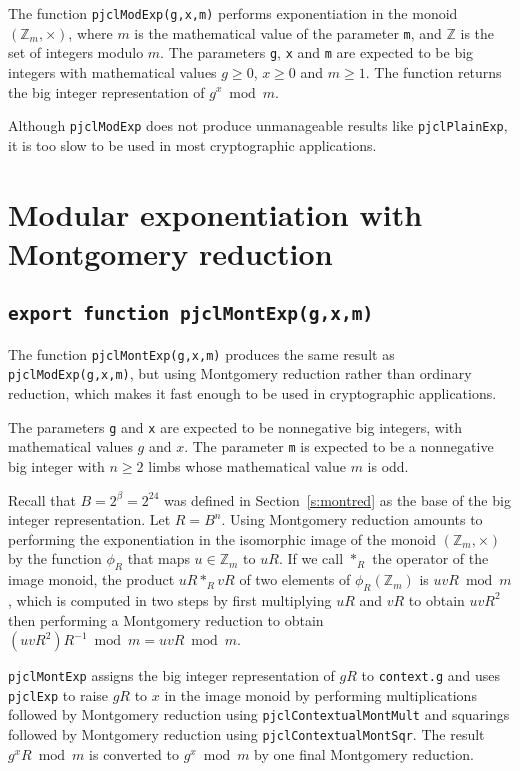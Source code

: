 \documentclass[12pt]{article}
\begin{document}
The function {\tt pjclModExp(g,x,m)} performs exponentiation in the
monoid $(\mathbb{Z}_m,\times)$, where $m$ is the mathematical value of
the parameter {\tt m}, and $\mathbb{Z}$ is the set of integers modulo
$m$.  The parameters {\tt g}, {\tt x} and {\tt m} are expected to be
big integers with mathematical values $g \geq 0$, $x \geq 0$ and $m \geq 1$.
The function returns the big integer representation of $g^x \bmod m$.

Although {\tt pjclModExp} does not produce unmanageable results like
{\tt pjclPlainExp}, it is too slow to be used in most cryptographic
applications.

\section{Modular exponentiation with Montgomery reduction}

\subsection{\tt export function pjclMontExp(g,x,m)}

The function {\tt pjclMontExp(g,x,m)} produces the same result as {\tt
  pjclModExp(g,x,m)}, but using Montgomery reduction rather than
ordinary reduction, which makes it fast enough to be used in
cryptographic applications.

The parameters {\tt g} and {\tt x} are expected to be nonnegative big
integers, with mathematical values $g$ and $x$.  The
parameter {\tt m} is expected to be a nonnegative big integer with $n \geq 2$
limbs whose mathematical value $m$ is odd.

Recall that $B = 2^\beta = 2^{24}$ was defined in
Section~\ref{s:montred} as the base of the big integer representation.
Let $R = B^n$.  Using Montgomery reduction amounts to performing the
exponentiation in the isomorphic image of the monoid
$(\mathbb{Z}_m,\times)$ by the function $\phi_R$ that maps $u \in
\mathbb{Z}_m$ to $uR$.  If we call $\ast_R$ the operator of the image
monoid, the product $uR \ast_R vR$ of two elements of
$\phi_R(\mathbb{Z}_m)$ is $uvR \bmod m$, which is computed in two steps
by first multiplying $uR$ and $vR$ to obtain $uvR^2$ then performing a
Montgomery reduction to obtain $(uvR^2)R^{-1} \bmod m = uvR \bmod m$.

{\tt pjclMontExp} assigns the big integer representation of $gR$ to
{\tt context.g} and uses {\tt pjclExp} to raise $gR$ to $x$ in the
image monoid by performing multiplications followed by Montgomery
reduction using {\tt pjclContextualMontMult} and squarings followed by
Montgomery reduction using {\tt pjclContextualMontSqr}.  The result
$g^xR \bmod m$ is converted to $g^x \bmod m$ by one final Montgomery
reduction.
\end{document}
